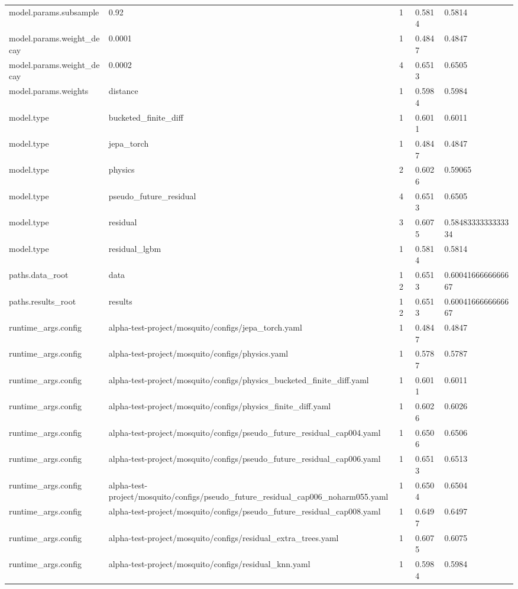 \begin{tabular}{lllll}
model.params.subsample & 0.92 & 1 & 0.5814 & 0.5814 \\
model.params.weight\_decay & 0.0001 & 1 & 0.4847 & 0.4847 \\
model.params.weight\_decay & 0.0002 & 4 & 0.6513 & 0.6505 \\
model.params.weights & distance & 1 & 0.5984 & 0.5984 \\
model.type & bucketed\_finite\_diff & 1 & 0.6011 & 0.6011 \\
model.type & jepa\_torch & 1 & 0.4847 & 0.4847 \\
model.type & physics & 2 & 0.6026 & 0.59065 \\
model.type & pseudo\_future\_residual & 4 & 0.6513 & 0.6505 \\
model.type & residual & 3 & 0.6075 & 0.5848333333333334 \\
model.type & residual\_lgbm & 1 & 0.5814 & 0.5814 \\
paths.data\_root & data & 12 & 0.6513 & 0.6004166666666667 \\
paths.results\_root & results & 12 & 0.6513 & 0.6004166666666667 \\
runtime\_args.config & alpha-test-project/mosquito/configs/jepa\_torch.yaml & 1 & 0.4847 & 0.4847 \\
runtime\_args.config & alpha-test-project/mosquito/configs/physics.yaml & 1 & 0.5787 & 0.5787 \\
runtime\_args.config & alpha-test-project/mosquito/configs/physics\_bucketed\_finite\_diff.yaml & 1 & 0.6011 & 0.6011 \\
runtime\_args.config & alpha-test-project/mosquito/configs/physics\_finite\_diff.yaml & 1 & 0.6026 & 0.6026 \\
runtime\_args.config & alpha-test-project/mosquito/configs/pseudo\_future\_residual\_cap004.yaml & 1 & 0.6506 & 0.6506 \\
runtime\_args.config & alpha-test-project/mosquito/configs/pseudo\_future\_residual\_cap006.yaml & 1 & 0.6513 & 0.6513 \\
runtime\_args.config & alpha-test-project/mosquito/configs/pseudo\_future\_residual\_cap006\_noharm055.yaml & 1 & 0.6504 & 0.6504 \\
runtime\_args.config & alpha-test-project/mosquito/configs/pseudo\_future\_residual\_cap008.yaml & 1 & 0.6497 & 0.6497 \\
runtime\_args.config & alpha-test-project/mosquito/configs/residual\_extra\_trees.yaml & 1 & 0.6075 & 0.6075 \\
runtime\_args.config & alpha-test-project/mosquito/configs/residual\_knn.yaml & 1 & 0.5984 & 0.5984 \\

\end{tabular}

